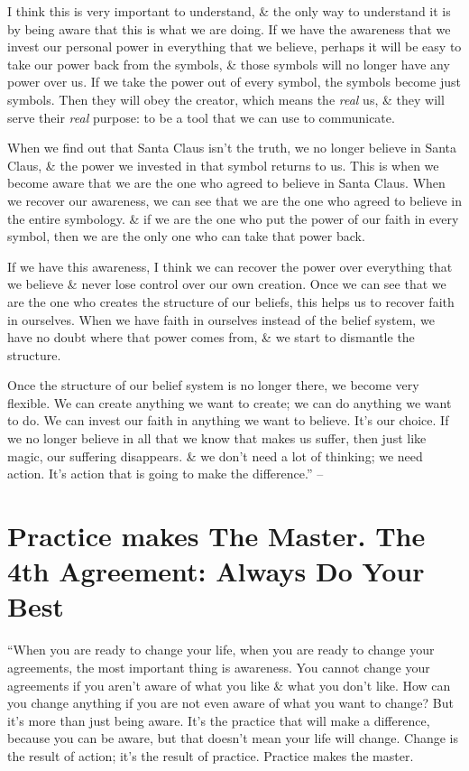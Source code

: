 \documentclass{article}
\numberwithin{equation}{section}
\begin{document}
I think this is very important to understand, \& the only way to understand it is by being aware that this is what we are doing. If we have the awareness that we invest our personal power in everything that we believe, perhaps it will be easy to take our power back from the symbols, \& those symbols will no longer have any power over us. If we take the power out of every symbol, the symbols become just symbols. Then they will obey the creator, which means the \textit{real} us, \& they will serve their \textit{real} purpose: to be a tool that we can use to communicate.

When we find out that Santa Claus isn't the truth, we no longer believe in Santa Claus, \& the power we invested in that symbol returns to us. This is when we become aware that we are the one who agreed to believe in Santa Claus. When we recover our awareness, we can see that we are the one who agreed to believe in the entire symbology. \& if we are the one who put the power of our faith in every symbol, then we are the only one who can take that power back.

If we have this awareness, I think we can recover the power over everything that we believe \& never lose control over our own creation. Once we can see that we are the one who creates the structure of our beliefs, this helps us to recover faith in ourselves. When we have faith in ourselves instead of the belief system, we have no doubt where that power comes from, \& we start to dismantle the structure.

Once the structure of our belief system is no longer there, we become very flexible. We can create anything we want to create; we can do anything we want to do. We can invest our faith in anything we want to believe. It's our choice. If we no longer believe in all that we know that makes us suffer, then just like magic, our suffering disappears. \& we don't need a lot of thinking; we need action. It's action that is going to make the difference.'' -- \cite[pp. 60--64]{Ruiz_Ruiz2011}


\section{Practice makes The Master. The 4th Agreement: Always Do Your Best}
``When you are ready to change your life, when you are ready to change your agreements, the most important thing is awareness. You cannot change your agreements if you aren't aware of what you like \& what you don't like. How can you change anything if you are not even aware of what you want to change? But it's more than just being aware. It's the practice that will make a difference, because you can be aware, but that doesn't mean your life will change. Change is the result of action; it's the result of practice. Practice makes the master.
\end{document}
